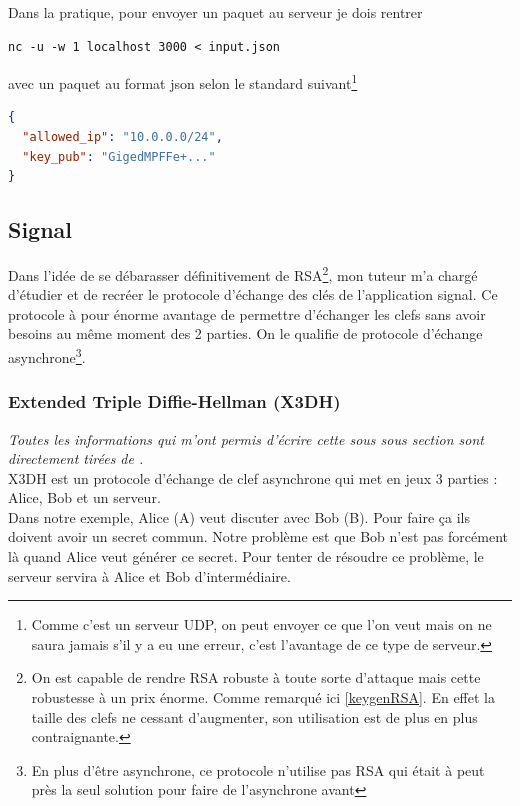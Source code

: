 \documentclass[a4paper, 12pt]{article}
\begin{document}
\noindent Dans la pratique, pour envoyer un paquet au serveur je dois rentrer 
\begin{center}
\begin{minipage}{.67\linewidth}
\begin{lstlisting}[language = shell]
nc -u -w 1 localhost 3000 < input.json
\end{lstlisting}
\end{minipage}
\end{center}
avec un paquet au format json selon le standard suivant\footnote{Comme c'est un serveur UDP, on peut envoyer ce que l'on veut mais on ne saura jamais s'il y a eu une erreur, c'est l'avantage de ce type de serveur.}
\begin{center}
\begin{minipage}{.51\linewidth}
\begin{lstlisting}[language = json]
{
  "allowed_ip": "10.0.0.0/24", 
  "key_pub": "GigedMPFFe+..."
}
\end{lstlisting}
\end{minipage}
\end{center}


\subsection{Signal}
Dans l'idée de se débarasser définitivement de RSA\footnote{On est capable de rendre RSA robuste à toute sorte d'attaque mais cette robustesse à un prix énorme. Comme remarqué ici \ref{keygenRSA}. En effet la taille des clefs ne cessant d'augmenter, son utilisation est de plus en plus contraignante.}, mon tuteur m'a chargé d'étudier et de recréer le protocole d'échange des clés de l'application signal. Ce protocole à pour énorme avantage de permettre d'échanger les clefs sans avoir besoins au même moment des 2 parties. On le qualifie de protocole d'échange asynchrone\footnote{En plus d'être asynchrone, ce protocole n'utilise pas RSA qui était à peut près la seul solution pour faire de l'asynchrone avant}.

\subsubsection{Extended Triple Diffie-Hellman (X3DH)}
\noindent\emph{Toutes les informations qui m'ont permis d'écrire cette sous sous section sont directement tirées de \cite{xtroisdh}.}\\

X3DH est un protocole d'échange de clef asynchrone qui met en jeux 3 parties : Alice, Bob et un serveur. \\
Dans notre exemple, Alice (A) veut discuter avec Bob (B). Pour faire ça ils doivent avoir un secret commun. Notre problème est que Bob n'est pas forcément là quand Alice veut générer ce secret. Pour tenter de résoudre ce problème, le serveur servira à Alice et Bob d'intermédiaire.
\end{document}
